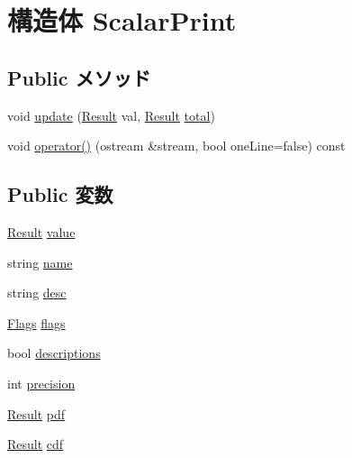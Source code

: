 \hypertarget{structStats_1_1ScalarPrint}{
\section{構造体 ScalarPrint}
\label{structStats_1_1ScalarPrint}
}
\subsection*{Public メソッド}
\begin{DoxyCompactItemize}
\item 
void \hyperlink{structStats_1_1ScalarPrint_abb30c481bf51f6c908d03a112985912e}{update} (\hyperlink{namespaceStats_ad874d2cfd4b4a29ebd480bb2e67f20ae}{Result} val, \hyperlink{namespaceStats_ad874d2cfd4b4a29ebd480bb2e67f20ae}{Result} \hyperlink{namespaceStats_a4031dfee086a6a4cf1deea1fff2e0d5c}{total})
\item 
void \hyperlink{structStats_1_1ScalarPrint_a1136524df9fc1bfd82a7b2f37a896310}{operator()} (ostream \&stream, bool oneLine=false) const 
\end{DoxyCompactItemize}
\subsection*{Public 変数}
\begin{DoxyCompactItemize}
\item 
\hyperlink{namespaceStats_ad874d2cfd4b4a29ebd480bb2e67f20ae}{Result} \hyperlink{structStats_1_1ScalarPrint_abc7841b7d107d40bf18692982c1a8f6f}{value}
\item 
string \hyperlink{structStats_1_1ScalarPrint_a8ccf841cb59e451791bcb2e1ac4f1edc}{name}
\item 
string \hyperlink{structStats_1_1ScalarPrint_acc6fde76f2c440ef4a9f7dc3765038b5}{desc}
\item 
\hyperlink{classFlags}{Flags} \hyperlink{structStats_1_1ScalarPrint_aa991e2b209ef26272bf4fd920777bcda}{flags}
\item 
bool \hyperlink{structStats_1_1ScalarPrint_ada0eec8923acca0939a06f40c6a88af8}{descriptions}
\item 
int \hyperlink{structStats_1_1ScalarPrint_aa95455ed52a8459fad69509a4a0411b5}{precision}
\item 
\hyperlink{namespaceStats_ad874d2cfd4b4a29ebd480bb2e67f20ae}{Result} \hyperlink{structStats_1_1ScalarPrint_aa46e8ac10e602fadd5fcc255eb438647}{pdf}
\item 
\hyperlink{namespaceStats_ad874d2cfd4b4a29ebd480bb2e67f20ae}{Result} \hyperlink{structStats_1_1ScalarPrint_af81607aeb4abb7b001933d45b1b672d6}{cdf}
\end{DoxyCompactItemize}


